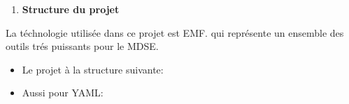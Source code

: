 \begin{enumerate}
\def\labelenumi{\arabic{enumi}.}
\item
  \textbf{Structure du projet}
\end{enumerate}

La téchnologie utilisée dans ce projet est EMF. qui représente un
ensemble des outils trés puissants pour le MDSE.

\begin{itemize}
\item
  Le projet à la structure suivante:\\
  \begin{figure}[H]
    \begin{center}
        \caption{}
    \end{center}
\end{figure}
  
\item
  Aussi pour YAML:\\
  \begin{figure}[H]
    \begin{center}
        \caption{}
    \end{center}
\end{figure}
\end{itemize}
